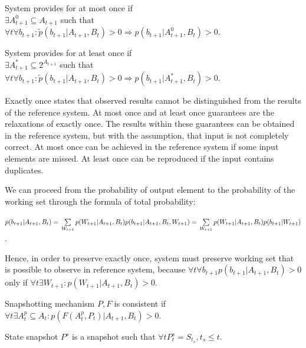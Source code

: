 \begin{definition}{System provides for at most once}
if \\
$\exists{A^{0}_{t+1}\subseteq{A_{t+1}}}$ such that \\
$\forall{t} \forall{b_{t+1}}: \widetilde{p}(b_{t+1}|A_{t+1},B_t)>0 \Rightarrow p(b_{t+1}|A^{0}_{t+1},B_t)>0$.
\end{definition}

\begin{definition}{System provides for at least once}
if \\
$\exists{A^{*}_{t+1}\subseteq{2^{A_{t+1}}}}$ such that \\
$\forall{t} \forall{b_{t+1}}: \widetilde{p}(b_{t+1}|A_{t+1},B_t)>0 \Rightarrow p(b_{t+1}|A^{*}_{t+1},B_t)>0$.
\end{definition}

Exactly once states that observed results cannot be distinguished from the results of the reference system. At most once and at least once guarantees are the relaxations of exactly once. The results within these guarantees can be obtained in the reference system, but with the assumption, that input is not completely correct. At most once can be achieved in the reference system if some input elements are missed. At least once can be reproduced if the input contains duplicates. 

We can proceed from the probability of output element to the probability of the working set through the formula of total probability:

$p(b_{t+1}|A_{t+1},B_t)=\\
\sum\limits_{W_{t+1}}p(W_{t+1}|A_{t+1},B_t)p(b_{t+1}|A_{t+1},B_t,W_{t+1})=\\
\sum\limits_{W_{t+1}}p(W_{t+1}|A_{t+1},B_t)p(b_{t+1}|W_{t+1})
$.

Hence, in order to preserve exactly once, system must preserve working set that is possible to observe in reference system, because $\forall{t} \forall{b_{t+1}} p(b_{t+1}|A_{t+1},B_t)>0$ only if $\forall{t} \exists{W_{t+1}}:p(W_{t+1}|A_{t+1},B_t)>0$.

\begin{definition}{Snapshotting mechanism $P,F$ is consistent}
if $\forall{t} \exists{A^{p}_t\subseteq{A_t}} : p(F(A^{p}_t,P_t)|A_{t+1},B_t)>0$.
\end{definition}


\begin{definition}{State snapshot}
$P^{s}$ is a snapshot such that $\forall{t} P^{s}_t = S_{t_s},t_s \leq t$.
\end{definition}

